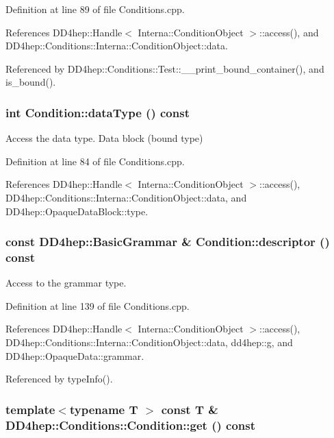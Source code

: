 Definition at line 89 of file Conditions.cpp.

References DD4hep::Handle$<$ Interna::ConditionObject $>$::access(), and DD4hep::Conditions::Interna::ConditionObject::data.

Referenced by DD4hep::Conditions::Test::\_\-\_\-print\_\-bound\_\-container(), and is\_\-bound().\hypertarget{class_d_d4hep_1_1_conditions_1_1_condition_a927e07797c9f318c43aa7ed220e3b424}{
\subsubsection[{dataType}]{\setlength{\rightskip}{0pt plus 5cm}int Condition::dataType () const}}
\label{class_d_d4hep_1_1_conditions_1_1_condition_a927e07797c9f318c43aa7ed220e3b424}


Access the data type. Data block (bound type) 

Definition at line 84 of file Conditions.cpp.

References DD4hep::Handle$<$ Interna::ConditionObject $>$::access(), DD4hep::Conditions::Interna::ConditionObject::data, and DD4hep::OpaqueDataBlock::type.\hypertarget{class_d_d4hep_1_1_conditions_1_1_condition_a858566d0194945ed9b0e0de1bf2597cd}{
\subsubsection[{descriptor}]{\setlength{\rightskip}{0pt plus 5cm}const {\bf DD4hep::BasicGrammar} \& Condition::descriptor () const}}
\label{class_d_d4hep_1_1_conditions_1_1_condition_a858566d0194945ed9b0e0de1bf2597cd}


Access to the grammar type. 

Definition at line 139 of file Conditions.cpp.

References DD4hep::Handle$<$ Interna::ConditionObject $>$::access(), DD4hep::Conditions::Interna::ConditionObject::data, dd4hep::g, and DD4hep::OpaqueData::grammar.

Referenced by typeInfo().\hypertarget{class_d_d4hep_1_1_conditions_1_1_condition_a8e5ee257360520a40edf585d93874d1f}{
\subsubsection[{get}]{\setlength{\rightskip}{0pt plus 5cm}template$<$typename T $>$ const {\bf T} \& DD4hep::Conditions::Condition::get () const}}
\label{class_d_d4hep_1_1_conditions_1_1_condition_a8e5ee257360520a40edf585d93874d1f}


